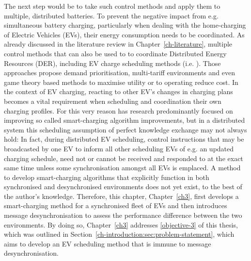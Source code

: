 The next step would be to take such control methods and apply them to multiple, distributed batteries.
To prevent the negative impact from e.g. simultaneous battery charging, particularly when dealing with the home-charging of Electric Vehicles (EVs), their energy consumption needs to be coordinated.
As already discussed in the literature review in Chapter~\ref{ch-literature}, multiple control methods that can also be used to to coordinate Distributed Energy Resources (DER), including EV charge scheduling methods (i.e. \cite{Atia2016, Bidram2012, Bidram2014, Dolan2012, Gill2014, Guerrero2008, Guerrero2013, Sugihara2013, Toledo2013, Wang2016, Vovos2007, Guerrero2013a, Mansouri-Samani1993, Marra2013, Mokhtari2013}). 
Those approaches propose demand prioritisation, multi-tariff environments and even game theory based methods to maximise utility or to operating reduce cost.
In the context of EV charging, reacting to other EV's changes in charging plans becomes a vital requirement when scheduling and coordination their own charging profiles.
For this very reason has research predominantly focused on improving so called smart-charging algorithm improvements, but in a distributed system this scheduling assumption of perfect knowledge exchange may not always hold:
In fact, during distributed EV scheduling, control instructions that may be broadcasted by one EV to inform all other scheduling EVs of e.g. an updated charging schedule, need not or cannot be received and responded to at the exact same time unless some synchronisation amongst all EVs is emplaced.
A method to develop smart-charging algorithms that explicitly function in both synchronised and desynchronised environments does not yet exist, to the best of the author's knowledge.
Therefore, this chapter, Chapter~\ref{ch3}, first develops a smart-charging method for a synchronised fleet of EVs and then introduces message desynchronisation to assess the performance difference between the two environments.
By doing so, Chapter~\ref{ch3} addresses \ref{objective-3} of this thesis, which was outlined in Section~\ref{ch-introduction:sec:problem-statement}, which aims to develop an EV scheduling method that is immune to message desynchronisation.

